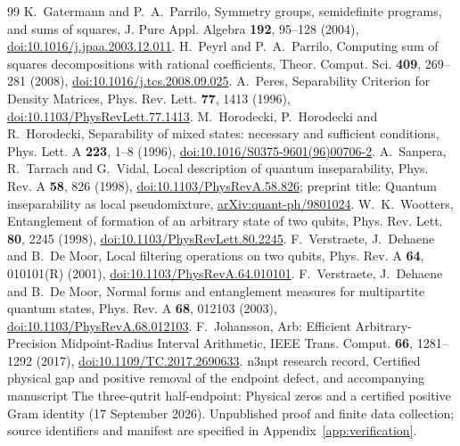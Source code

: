 \documentclass[11pt,a4paper]{article}
\theoremstyle{definition}\newtheorem{definition}[theorem]{Definition}
\theoremstyle{remark}\newtheorem{remark}[theorem]{Remark}
\numberwithin{equation}{section}
\begin{document}
\begin{thebibliography}{99}
K.~Gatermann and P.~A.~Parrilo, Symmetry groups, semidefinite programs,
and sums of squares, J. Pure Appl. Algebra \textbf{192}, 95--128 (2004),
\href{https://doi.org/10.1016/j.jpaa.2003.12.011}{doi:10.1016/j.jpaa.2003.12.011}.
H.~Peyrl and P.~A.~Parrilo, Computing sum of squares decompositions
with rational coefficients, Theor. Comput. Sci. \textbf{409}, 269--281 (2008),
\href{https://doi.org/10.1016/j.tcs.2008.09.025}{doi:10.1016/j.tcs.2008.09.025}.
A.~Peres, Separability Criterion for Density Matrices,
Phys. Rev. Lett. \textbf{77}, 1413 (1996),
\href{https://doi.org/10.1103/PhysRevLett.77.1413}{doi:10.1103/PhysRevLett.77.1413}.
M.~Horodecki, P.~Horodecki and R.~Horodecki, Separability of mixed states:
necessary and sufficient conditions, Phys. Lett. A \textbf{223}, 1--8 (1996),
\href{https://doi.org/10.1016/S0375-9601(96)00706-2}{doi:10.1016/S0375-9601(96)00706-2}.
A.~Sanpera, R.~Tarrach and G.~Vidal, Local description of quantum
inseparability, Phys. Rev. A \textbf{58}, 826 (1998),
\href{https://doi.org/10.1103/PhysRevA.58.826}{doi:10.1103/PhysRevA.58.826};
preprint title: Quantum inseparability as local pseudomixture,
\href{https://arxiv.org/abs/quant-ph/9801024}{arXiv:quant-ph/9801024}.
W.~K.~Wootters, Entanglement of formation of an arbitrary state of
two qubits, Phys. Rev. Lett. \textbf{80}, 2245 (1998),
\href{https://doi.org/10.1103/PhysRevLett.80.2245}{doi:10.1103/PhysRevLett.80.2245}.
F.~Verstraete, J.~Dehaene and B.~De Moor, Local filtering operations
on two qubits, Phys. Rev. A \textbf{64}, 010101(R) (2001),
\href{https://doi.org/10.1103/PhysRevA.64.010101}{doi:10.1103/PhysRevA.64.010101}.
F.~Verstraete, J.~Dehaene and B.~De Moor, Normal forms and entanglement
measures for multipartite quantum states,
Phys. Rev. A \textbf{68}, 012103 (2003),
\href{https://doi.org/10.1103/PhysRevA.68.012103}{doi:10.1103/PhysRevA.68.012103}.
F.~Johansson, Arb: Efficient Arbitrary-Precision Midpoint-Radius
Interval Arithmetic, IEEE Trans. Comput. \textbf{66}, 1281--1292 (2017),
\href{https://doi.org/10.1109/TC.2017.2690633}{doi:10.1109/TC.2017.2690633}.
n3npt research record, Certified physical gap and positive removal
of the endpoint defect, and accompanying manuscript
The three-qutrit half-endpoint: Physical zeros and a certified positive
Gram identity (17 September 2026).
Unpublished proof and finite data collection; source identifiers and
manifest are specified in Appendix~\ref{app:verification}.

\end{thebibliography}
\end{document}
